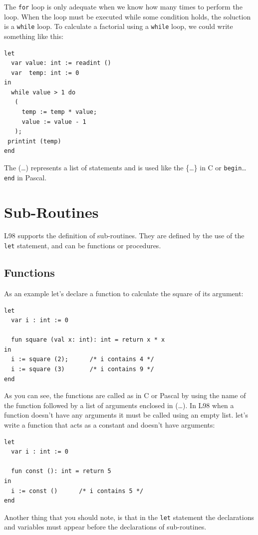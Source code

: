 \documentclass[a4paper, 11pt]{report}
\newcommand{\keyword}[1]{\texttt{#1}}
\begin{document}
The \keyword{for} loop is only adequate when we know how many
times to perform the loop. When the loop must be executed while some
condition holds, the soluction is a \keyword{while} loop. To calculate
a factorial using a \keyword{while} loop, we could write something like
this:

\begin{lstlisting}
let
  var value: int := readint ()
  var  temp: int := 0
in
  while value > 1 do
   (
     temp := temp * value;
     value := value - 1
   );
 printint (temp)
end
\end{lstlisting}

The (\dots) represents a list of statements and is used like the \{\dots\} in C
or \keyword{begin}\dots\keyword{end} in Pascal.


\section{Sub-Routines}
L98 supports the definition of sub-routines. They are defined by the use of
the \keyword{let} statement, and can be functions or procedures.

\subsection{Functions}
As an example let's declare a function to calculate the square of its argument:

\begin{lstlisting}
let
  var i : int := 0

  fun square (val x: int): int = return x * x
in
  i := square (2);      /* i contains 4 */
  i := square (3)       /* i contains 9 */ 
end
\end{lstlisting}

As you can see, the functions are called as in C or Pascal by using the
name of the function followed by a list of arguments enclosed in (\dots). In
L98 when a function doesn't have any arguments it must be called using an
empty list. let's write a function that acts as a constant and doesn't have
arguments:

\begin{lstlisting}
let
  var i : int := 0

  fun const (): int = return 5
in
  i := const ()      /* i contains 5 */
end
\end{lstlisting}

Another thing that you should note, is that in the \keyword{let} statement the
declarations and variables must appear before the declarations of sub-routines.
\end{document}
